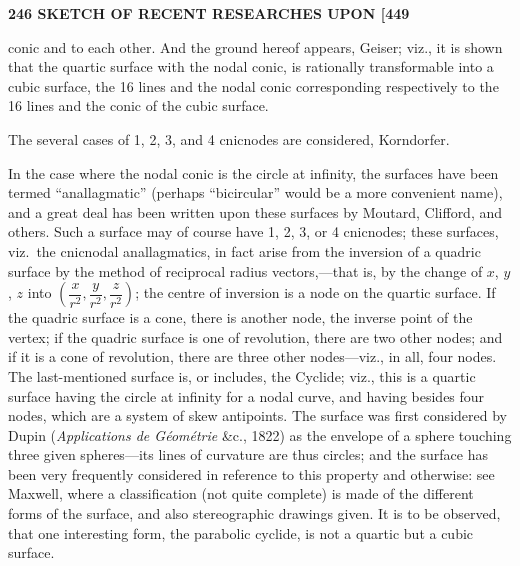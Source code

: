 \documentclass[11pt]{article}
\begin{document}
\medskip
\noindent\textbf{246 \hfill SKETCH OF RECENT RESEARCHES UPON \hfill [449}

\medskip

conic and to each other. And the ground hereof appears, Geiser; viz., it is shown
that the quartic surface with the nodal conic, is rationally transformable into a cubic
surface, the 16 lines and the nodal conic corresponding respectively to the 16 lines and
the conic of the cubic surface.

The several cases of 1, 2, 3, and 4 cnicnodes are considered, Korndorfer.

In the case where the nodal conic is the circle at infinity, the surfaces have been
termed ``anallagmatic'' (perhaps ``bicircular'' would be a more convenient name), and
a great deal has been written upon these surfaces by Moutard, Clifford, and others.
Such a surface may of course have 1, 2, 3, or 4 cnicnodes; these surfaces, viz.\ the
cnicnodal anallagmatics, in fact arise from the inversion of a quadric surface by the
method of reciprocal radius vectors,---that is, by the change of $x$, $y$, $z$ into $\left(\dfrac{x}{r^2}, \dfrac{y}{r^2}, \dfrac{z}{r^2}\right)$;
the centre of inversion is a node on the quartic surface. If the quadric surface is
a cone, there is another node, the inverse point of the vertex; if the quadric surface
is one of revolution, there are two other nodes; and if it is a cone of revolution,
there are three other nodes---viz., in all, four nodes. The last-mentioned surface is, or
includes, the Cyclide; viz., this is a quartic surface having the circle at infinity for
a nodal curve, and having besides four nodes, which are a system of skew antipoints.
The surface was first considered by Dupin (\textit{Applications de G\'eom\'etrie} \&c., 1822) as the
envelope of a sphere touching three given spheres---its lines of curvature are thus
circles; and the surface has been very frequently considered in reference to this
property and otherwise: see Maxwell, where a classification (not quite complete) is made
of the different forms of the surface, and also stereographic drawings given. It is to
be observed, that one interesting form, the parabolic cyclide, is not a quartic but a cubic
surface.
\end{document}
